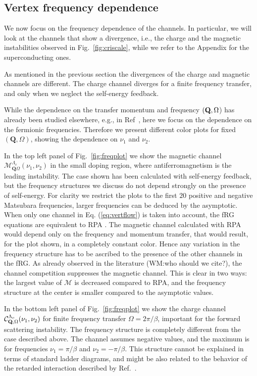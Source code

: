 \subsection{Vertex frequency dependence}

We now focus on the frequency dependence of the channels. 
In particular, we will look at the channels that show a divergence, i.e., the charge and the magnetic instabilities observed in Fig.~\ref{fig:criscale}, while we refer to the Appendix for the superconducting ones.

As mentioned in the previous section the divergences of the charge and magnetic channels are different. The charge channel diverges for a finite frequency transfer, and only when we neglect the self-energy feedback. 

While the dependence on the transfer momentum and frequency $(\mathbf{Q},\Omega$) has already been studied elsewhere, e.g., in Ref~, here we focus on the dependence on the fermionic frequencies. 
Therefore we present different color plots for fixed  $(\mathbf{Q},\Omega)$, showing the dependence on $\nu_1$ and $\nu_2$. 
 
In the top left panel of Fig.~\ref{fig:freqplot} we show the magnetic channel $\mathcal{M}^{\Lambda_c}_{\mathbf{Q}\Omega}(\nu_1,\nu_2)$ in the small doping region, where antiferromagnetism is the leading instability. 
The case shown has been calculated with self-energy feedback, but the frequency structures we discuss do not depend strongly on 
the presence of self-energy. 
For clarity we restrict the plots to the first $20$ positive and negative Matsubara frequencies, larger frequencies can be deduced by the asymptotic.\cite{Wentzell2016a}
When only one channel in Eq. (\ref{eq:vertflow}) is taken into account, the fRG equations are equivalent to RPA . 
The magnetic channel calculated with RPA would depend only on the frequency and momentum transfer, that would result, for the plot shown, in a completely constant color.
Hence any variation in the frequency structure has to be ascribed to the presence of the other channels in the fRG.
As already observed in the literature (WM:who should we cite?), the channel competition suppresses the magnetic channel. 
This is clear in two ways: the largest value of $\mathcal{M}$ is decreased compared to RPA, and the frequency structure at the center is smaller compared to the asymptotic values. 

In the bottom left panel of Fig.~\ref{fig:freqplot} we show the charge channel $\mathcal{C}^{\Lambda_c}_{\mathbf{Q},\Omega}(\nu_1,\nu_2)$ for finite frequency transfer $\Omega=2\pi/\beta$, important for the forward scattering instability. 
The frequency structure is completely different from the case described above. 
The channel assumes negative values, and the maximum is for frequencies $\nu_1 = \pi/\beta$ and $\nu_2=-\pi/\beta$. 
This structure cannot be explained in terms of standard ladder diagrams, and might be also related to the behavior of the retarded interaction described by Ref.~.

